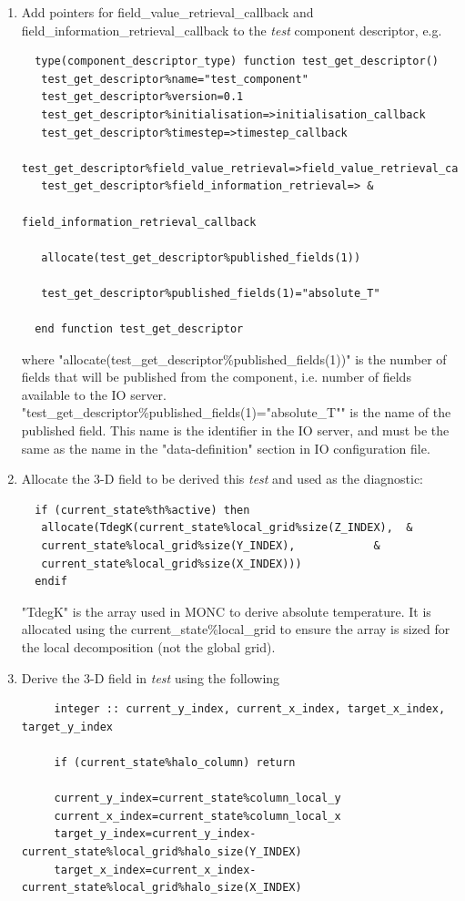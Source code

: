 \documentclass[a4paper,11pt]{article}
\begin{document}
\begin{enumerate}
  \item {Add pointers for field\_value\_retrieval\_callback and
  field\_information\_retrieval\_callback to the \emph{test} component
  descriptor, e.g.
  \begin{lstlisting}
  type(component_descriptor_type) function test_get_descriptor()
   test_get_descriptor%name="test_component"
   test_get_descriptor%version=0.1
   test_get_descriptor%initialisation=>initialisation_callback
   test_get_descriptor%timestep=>timestep_callback
   test_get_descriptor%field_value_retrieval=>field_value_retrieval_callback
   test_get_descriptor%field_information_retrieval=> &
                                   field_information_retrieval_callback

   allocate(test_get_descriptor%published_fields(1))

   test_get_descriptor%published_fields(1)="absolute_T"

  end function test_get_descriptor
  \end{lstlisting}
  where "allocate(test\_get\_descriptor\%published\_fields(1))" is the number of
  fields that will be published from the component, i.e. number of fields
  available to the IO server. "test\_get\_descriptor\%published\_fields(1)="absolute\_T""
  is the name of the published field. This name is the identifier in the IO
  server, and must be the same as the name in the "data-definition" section in
  IO configuration file.
  }
  \item {Allocate the 3-D field to be derived this \emph{test} and used as the
  diagnostic:
  \begin{lstlisting}
  if (current_state%th%active) then
   allocate(TdegK(current_state%local_grid%size(Z_INDEX),  &
   current_state%local_grid%size(Y_INDEX),            &
   current_state%local_grid%size(X_INDEX)))
  endif
  \end{lstlisting}
  "TdegK" is the array used in MONC to derive absolute temperature. It is allocated
   using the current\_state\%local\_grid to ensure the array is sized for the local
   decomposition (not the global grid).
   }
   \item{Derive the 3-D field in \emph{test} using the following
   \begin{lstlisting}
     integer :: current_y_index, current_x_index, target_x_index, target_y_index

     if (current_state%halo_column) return

     current_y_index=current_state%column_local_y
     current_x_index=current_state%column_local_x
     target_y_index=current_y_index-current_state%local_grid%halo_size(Y_INDEX)
     target_x_index=current_x_index-current_state%local_grid%halo_size(X_INDEX)


\end{lstlisting}}
\end{enumerate}
\end{document}
